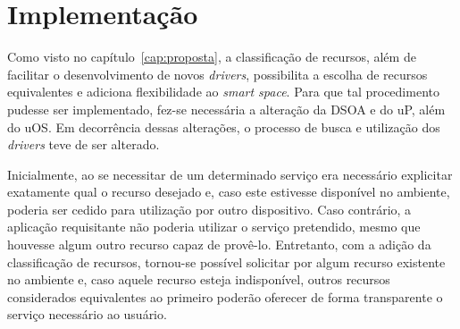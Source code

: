 \chapter{Implementação}

Como visto no capítulo~\ref{cap:proposta}, a classificação de recursos, além de facilitar o desenvolvimento de novos \emph{drivers}, possibilita a escolha de recursos equivalentes e adiciona flexibilidade ao \emph{smart space}. Para que tal procedimento pudesse ser implementado, fez-se necessária a alteração da DSOA e do uP, além do uOS. Em decorrência dessas alterações, o processo de busca e utilização dos \emph{drivers} teve de ser alterado.

Inicialmente, ao se necessitar de um determinado serviço era necessário explicitar exatamente qual o recurso desejado e, caso este estivesse disponível no ambiente, poderia ser cedido para utilização por outro dispositivo. Caso contrário, a aplicação requisitante não poderia utilizar o serviço pretendido, mesmo que houvesse algum outro recurso capaz de provê-lo. Entretanto, com a adição da classificação de recursos, tornou-se possível solicitar por algum recurso existente no ambiente e, caso aquele recurso esteja indisponível, outros recursos considerados equivalentes ao primeiro poderão oferecer de forma transparente o serviço necessário ao usuário.


